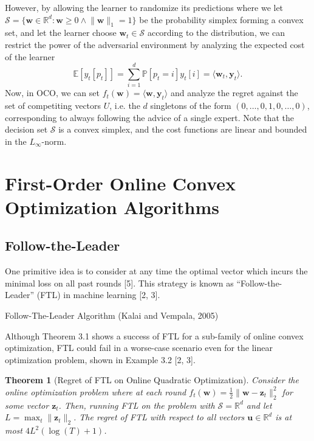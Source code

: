 \documentclass{article}
\newtheorem{theorem}{Theorem}[section]
\begin{document}
However, by allowing the learner to randomize its predictions where we let $\mathcal{S}=\{\textbf{w}\in \mathbb{R}^d: \textbf{w}\geq 0\wedge \lVert \textbf{w}\rVert_1=1\}$ be the probability simplex forming a convex set, and let the learner choose $\textbf{w}_t\in \mathcal{S}$ according to the distribution, we can restrict the power of the adversarial environment by analyzing the expected cost of the learner \[\mathbb{E}[y_t[p_t]]=\sum\limits_{i=1}^d \mathbb{P}[p_t=i]y_t[i]=\langle \textbf{w}_t, \textbf{y}_t\rangle.\]
Now, in OCO, we can set $f_t(\textbf{w})=\langle \textbf{w}, \textbf{y}_t\rangle$ and analyze the regret against the set of competiting vectors $U$, i.e. the $d$ singletons of the form $(0,\ldots, 0,1,0,\ldots, 0)$, corresponding to always following the advice of a single expert.
Note that the decision set $\mathcal{S}$ is a convex simplex, and the cost functions are linear and bounded in the $L_\infty$-norm.

\section{First-Order Online Convex Optimization Algorithms}

\subsection{Follow-the-Leader}
One primitive idea is to consider at any time the optimal vector which incurs the minimal loss on all past rounds [5]. This strategy is known as ``Follow-the-Leader'' (FTL) in machine learning [2, 3].

\begin{algorithm}[H]
  \caption{Follow-The-Leader Algorithm (Kalai and Vempala, 2005)}
\end{algorithm}

Although Theorem 3.1 shows a success of FTL for a sub-family of online convex optimization, FTL could fail in a worse-case scenario even for the linear optimization problem, shown in Example 3.2 [2, 3].

\begin{theorem}[Regret of FTL on Online Quadratic Optimization]
  Consider the online optimization problem where at each round $f_t(\textbf{w})=\frac{1}{2}\lVert \textbf{w}-\textbf{z}_t\rVert_2^2$ for some vector $\textbf{z}_t$. Then, running FTL on the problem with $\mathcal{S}=\mathbb{R}^d$ and let $L=\max_t\lVert \textbf{z}_t\rVert_2$. The regret of FTL with respect to all vectors $\textbf{u}\in \mathbb{R}^d$ is at most $4L^2(\log(T)+1)$.
\end{theorem}
\end{document}
